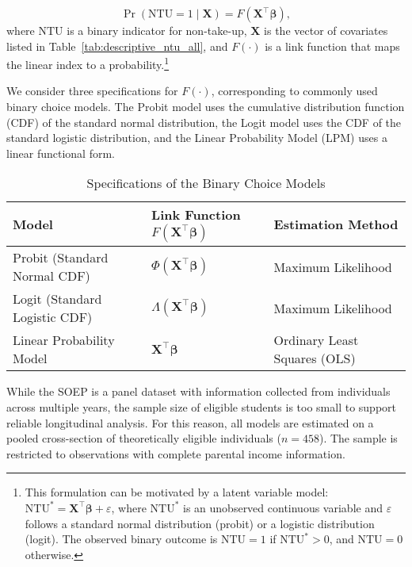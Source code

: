 \begin{equation}
  \Pr(\mathrm{NTU} = 1 \mid \mathbf{X}) = F(\mathbf{X}^\top \boldsymbol{\beta}),
\end{equation}
where \( \mathrm{NTU} \) is a binary indicator for non-take-up, \( \mathbf{X} \) is the vector of covariates listed in Table~\ref{tab:descriptive_ntu_all}, and \( F(\cdot) \) is a link function that maps the linear index to a probability.\footnote{
This formulation can be motivated by a latent variable model: \( \mathrm{NTU}^* = \mathbf{X}^\top \boldsymbol{\beta} + \varepsilon \), where \( \mathrm{NTU}^* \) is an unobserved continuous variable and \( \varepsilon \) follows a standard normal distribution (probit) or a logistic distribution (logit). The observed binary outcome is \( \mathrm{NTU} = 1 \) if \( \mathrm{NTU}^* > 0 \), and \( \mathrm{NTU} = 0 \) otherwise.
}

We consider three specifications for \( F(\cdot) \), corresponding to commonly used binary choice models. 
The Probit model uses the cumulative distribution function (CDF) of the standard normal distribution, the Logit model uses the CDF of the standard logistic distribution, and the Linear Probability Model (LPM) uses a linear functional form.

\begin{table}[H]
\footnotesize
\centering
\label{tab:model_specifications}
\begin{tabular}{@{}lll@{}}
\toprule
\textbf{Model} & \textbf{Link Function \( F(\mathbf{X}^\top \boldsymbol{\beta}) \)} & \textbf{Estimation Method} \\ \midrule
Probit (Standard Normal CDF) & \( \Phi(\mathbf{X}^\top \boldsymbol{\beta}) \) & Maximum Likelihood \\
Logit (Standard Logistic CDF) & \( \Lambda(\mathbf{X}^\top \boldsymbol{\beta}) \) & Maximum Likelihood \\
Linear Probability Model & \( \mathbf{X}^\top \boldsymbol{\beta} \) & Ordinary Least Squares (OLS) \\
\bottomrule
\end{tabular}
\caption{Specifications of the Binary Choice Models}
\end{table}

While the SOEP is a panel dataset with information collected from individuals across multiple years, the sample size of eligible students is too small to support reliable longitudinal analysis. For this reason, all models are estimated on a pooled cross-section of theoretically eligible individuals (\( n = 458 \)). The sample is restricted to observations with complete parental income information.


